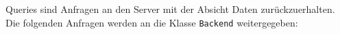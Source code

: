 Queries sind Anfragen an den Server mit der Absicht Daten zurückzuerhalten.
Die folgenden Anfragen werden an die Klasse \verb#Backend# weitergegeben: